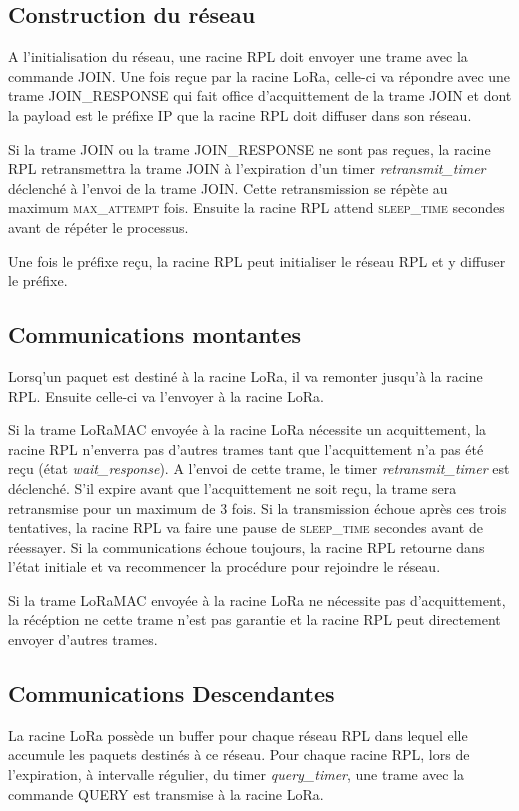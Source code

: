 \subsection*{Construction du réseau}
    A l'initialisation du réseau, une racine RPL doit envoyer une trame avec la commande JOIN. Une fois reçue par la racine LoRa, celle-ci va répondre avec une trame JOIN\_RESPONSE qui fait office d'acquittement de la trame JOIN et dont la payload est le préfixe IP que la racine RPL doit diffuser dans son réseau.

    Si la trame JOIN ou la trame JOIN\_RESPONSE ne sont pas reçues, la racine RPL retransmettra la trame JOIN à l'expiration d'un timer \textit{retransmit\_timer} déclenché à l'envoi de la trame JOIN. Cette retransmission se répète au maximum \textsc{max\_attempt} fois. Ensuite la racine RPL attend \textsc{sleep\_time} secondes avant de répéter le processus.

    Une fois le préfixe reçu, la racine RPL peut initialiser le réseau RPL et y diffuser le préfixe.

\subsection*{Communications montantes}
    Lorsq'un paquet est destiné à la racine LoRa, il va remonter jusqu'à la racine RPL. Ensuite celle-ci va l'envoyer à la racine LoRa.

    Si la trame LoRaMAC envoyée à la racine LoRa nécessite un acquittement, la racine RPL n'enverra pas d'autres trames tant que l'acquittement n'a pas été reçu (état \textit{wait\_response}).
    A l'envoi de cette trame, le timer \textit{retransmit\_timer} est déclenché. S'il expire avant que l'acquittement ne soit reçu, la trame sera retransmise pour un maximum de 3 fois. Si la transmission échoue après ces trois tentatives, la racine RPL va faire une pause de \textsc{sleep\_time} secondes avant de réessayer. Si la communications échoue toujours, la racine RPL retourne dans l'état initiale et va recommencer la procédure pour rejoindre le réseau.


    Si la trame LoRaMAC envoyée à la racine LoRa ne nécessite pas d'acquittement, la récéption ne cette trame n'est pas garantie et la racine RPL peut directement envoyer d'autres trames.

\subsection*{Communications Descendantes}
    La racine LoRa possède un buffer pour chaque réseau RPL dans lequel elle accumule les paquets destinés à ce réseau. Pour chaque racine RPL, lors de l'expiration, à intervalle régulier, du timer \textit{query\_timer}, une trame avec la commande QUERY est transmise à la racine LoRa.

